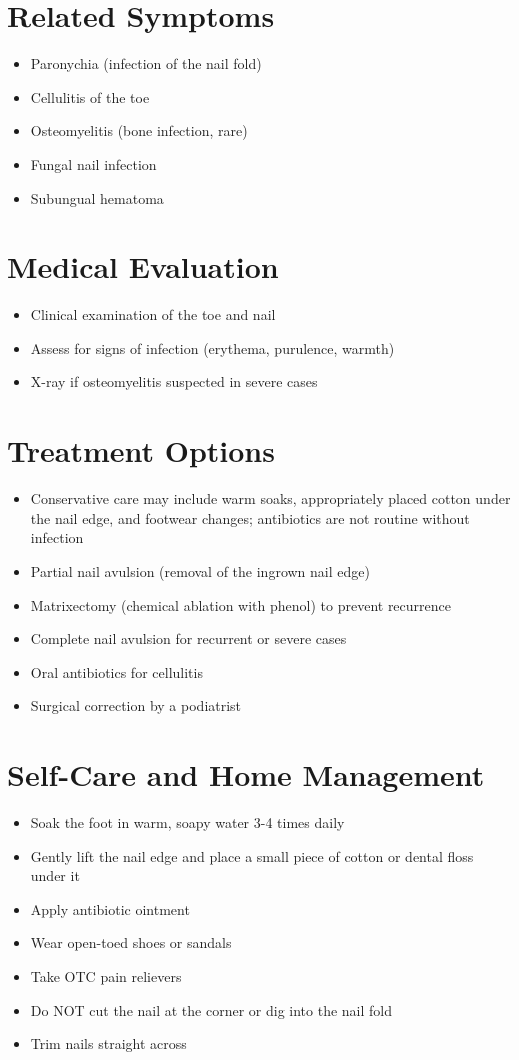 \section*{Related Symptoms}
\begin{itemize}
\item Paronychia (infection of the nail fold)
\item Cellulitis of the toe
\item Osteomyelitis (bone infection, rare)
\item Fungal nail infection
\item Subungual hematoma
\end{itemize}

\section*{Medical Evaluation}
\begin{itemize}
\item Clinical examination of the toe and nail
\item Assess for signs of infection (erythema, purulence, warmth)
\item X-ray if osteomyelitis suspected in severe cases
\end{itemize}

\section*{Treatment Options}
\begin{itemize}
\item Conservative care may include warm soaks, appropriately placed cotton under the nail edge, and footwear changes; antibiotics are not routine without infection
\item Partial nail avulsion (removal of the ingrown nail edge)
\item Matrixectomy (chemical ablation with phenol) to prevent recurrence
\item Complete nail avulsion for recurrent or severe cases
\item Oral antibiotics for cellulitis
\item Surgical correction by a podiatrist
\end{itemize}

\section*{Self-Care and Home Management}
\begin{itemize}
\item Soak the foot in warm, soapy water 3-4 times daily
\item Gently lift the nail edge and place a small piece of cotton or dental floss under it
\item Apply antibiotic ointment
\item Wear open-toed shoes or sandals
\item Take OTC pain relievers
\item Do NOT cut the nail at the corner or dig into the nail fold
\item Trim nails straight across
\end{itemize}

